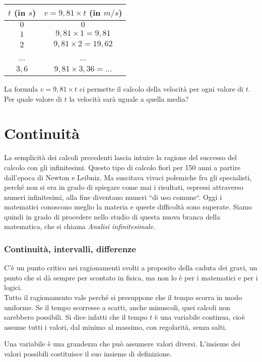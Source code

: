 \begin{center}
\begin{tabular}{cc}\toprule
$t$ (in $s$) & $v=9,81\times t$ (in $m/s$) \\\midrule
$0$ & $0$  \\
$1$ & $9,81\times 1 =9,81$ \\
$2$ & $9,81\times 2 =19,62$ \\
... & ... \\
$3,6$ & $9,81\times 3,36= ...$\\\bottomrule
\end{tabular}
\label{tab:diff_velocita}
\end{center}

La formula $v=9,81\times t$ ci permette il calcolo della velocità per ogni 
valore di $t$.
Per quale valore di \(t\) la velocità sarà uguale a quella media? 


\section{Continuità}
\label{04_diffcomtinuità}
La semplicità dei calcoli precedenti lascia intuire la ragione del successo 
del
calcolo con gli infinitesimi.  Questo tipo di calcolo fiorì per 150 anni a 
partire dall'epoca di Newton e Leibniz. Ma suscitava vivaci polemiche fra
gli specialisti, perché non si era in grado di spiegare come mai i 
risultati, espressi attraverso numeri infinitesimi, alla fine diventano numeri
``di uso comune``.
Oggi i matematici conoscono meglio la materia e queste difficoltà sono 
superate.
Siamo quindi in grado di procedere nello studio di questa nuova branca 
della 
matematica, che si chiama \emph{Analisi infinitesimale}.

\subsubsection{Continuità, intervalli, differenze}
\label{04_diffcontinterv}
C'è un punto critico nei ragionamenti svolti a proposito della caduta dei 
gravi,
un punto che si dà sempre per scontato in fisica, ma non lo è per i matematici
e per i logici.\\
Tutto il ragionamento vale perché si presuppone che il tempo scorra in modo
uniforme. Se il tempo scorresse a scatti, anche minuscoli, quei calcoli non
sarebbero possibili. Si dice infatti che il tempo $t$ è una variabile
continua, cioè assume tutti i valori, dal minimo al massimo, con regolarità,
senza salti.

\begin{definizione}
 Una variabile è una grandezza che può assumere valori diversi.
 L'insieme dei valori possibili costituisce il suo insieme di definizione.
\end{definizione}

